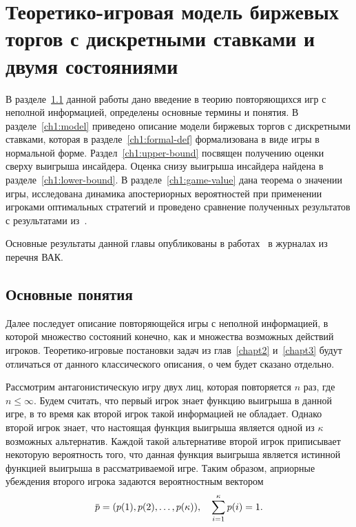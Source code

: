 \chapter{Теоретико-игровая модель биржевых торгов с дискретными ставками и двумя состояниями} \label{chapt1} 
{
\newcommand{\symm}[1]{\overline{#1}}
\newcommand{\pEven}[1][k]{p^0_{#1}}
\newcommand{\pOdd}[1][k]{p^{\beta}_{#1}}
\newcommand{\fEven}[1][k]{\phi^0_{#1}}
\newcommand{\fOdd}[1][k]{\phi^{\beta}_{#1}}

В разделе~\ref{ch1:intro} данной работы дано введение в теорию повторяющихся игр с неполной информацией, определены основные термины и понятия.
В разделе~\ref{ch1:model} приведено описание модели биржевых торгов с дискретными ставками, которая в разделе~\ref{ch1:formal-def} формализована в виде игры в нормальной форме.
Раздел~\ref{ch1:upper-bound} посвящен получению оценки сверху выигрыша инсайдера.
Оценка снизу выигрыша инсайдера найдена в разделе~\ref{ch1:lower-bound}.
В разделе~\ref{ch1:game-value} дана теорема о значении игры, исследована динамика апостериорных вероятностей при применении игроками оптимальных стратегий и проведено сравнение полученных результатов с результатами из~\cite{domansky07}.

Основные результаты данной главы опубликованы в работах~\cite{pyanykh14,pyanykh16:discr:eng} в журналах из перечня ВАК.

\section{Основные понятия}\label{ch1:intro}
Далее последует описание повторяющейся игры с неполной информацией, в которой множество состояний конечно, как и множества возможных действий игроков.
Теоретико-игровые постановки задач из глав~\ref{chapt2} и~\ref{chapt3} будут отличаться от данного классического описания, о чем будет сказано отдельно.

Рассмотрим антагонистическую игру двух лиц, которая повторяется $n$ раз, где $n\leq \infty$.
Будем считать, что первый игрок знает функцию выигрыша в данной игре, в то время как второй игрок такой информацией не обладает.
Однако второй игрок знает, что настоящая функция выигрыша является одной из $\kappa$ возможных альтернатив.
Каждой такой альтернативе второй игрок приписывает некоторую вероятность того, что данная функция выигрыша является истинной функцией выигрыша в рассматриваемой
игре.
Таким образом, априорные убеждения второго игрока задаются вероятностным вектором
\[
  \pd = (\pc{1}, \pc{2}, \ldots, \pc{\kappa}),\quad \sum_{i=1}^\kappa \pc{i} = 1.
\]

}
